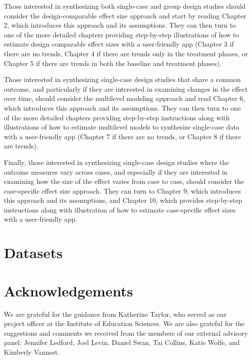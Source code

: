 \documentclass[
]{book}
\begin{document}
Those interested in synthesizing both single-case and group design studies should consider the design-comparable effect size approach and start by reading Chapter 2, which introduces this approach and its assumptions.
They can then turn to one of the more detailed chapters providing step-by-step illustrations of how to estimate design comparable effect sizes with a user-friendly app (Chapter 3 if there are no trends, Chapter 4 if there are trends only in the treatment phases, or Chapter 5 if there are trends in both the baseline and treatment phases).

Those interested in synthesizing single-case design studies that share a common outcome, and particularly if they are interested in examining changes in the effect over time, should consider the multilevel modeling approach and read Chapter 6, which introduces this approach and its assumptions.
They can then turn to one of the more detailed chapters providing step-by-step instructions along with illustrations of how to estimate multilevel models to synthesize single-case data with a user-friendly app (Chapter 7 if there are no trends, or Chapter 8 if there are trends).

Finally, those interested in synthesizing single-case design studies where the outcome measures vary across cases, and especially if they are interested in examining how the size of the effect varies from case to case, should consider the case-specific effect size approach.
They can turn to Chapter 9, which introduces this approach and its assumptions, and Chapter 10, which provides step-by-step instructions along with illustration of how to estimate case-specific effect sizes with a user-friendly app.

\hypertarget{datasets}{%
\section*{Datasets}\label{datasets}}

\hypertarget{acknowledgements}{%
\section*{Acknowledgements}\label{acknowledgements}}

We are grateful for the guidance from Katherine Taylor, who served as our project officer at the Institute of Education Sciences. We are also grateful for the suggestions and comments we received from the members of our external advisory panel: Jennifer Ledford, Joel Levin, Daniel Swan, Tai Collins, Katie Wolfe, and Kimberly Vannest.
\end{document}

